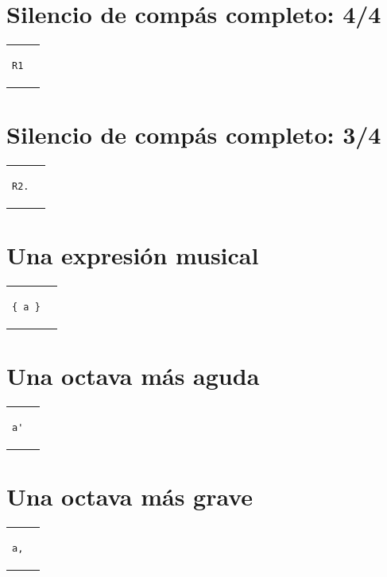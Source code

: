 \documentclass[a4paper,10pt,oneside,headinclude,titlepage]{article} %
\begin{document}
\section*{Silencio de compás completo: 4/4}
\begin{tabular}{m{2cm}m{2cm}}
\begin{verbatim}
R1
\end{verbatim}
&
\begin[fragment]{lilypond}
R1
\end{lilypond}
\end{tabular}

\section*{Silencio de compás completo: 3/4}
\begin{tabular}{m{2cm}m{2cm}}
\begin{verbatim}
R2.
\end{verbatim}
&
\begin[fragment]{lilypond}
\time 3/4 R2.
\end{lilypond}
\end{tabular}

\section*{Una expresión musical}
\begin{tabular}{m{2cm}m{2cm}}
\begin{verbatim}
{ a }
\end{verbatim}
&
\begin[fragment]{lilypond}
{ a }
\end{lilypond}
\end{tabular}

\section*{Una octava más aguda}
\begin{tabular}{m{2cm}m{2cm}}
\begin{verbatim}
a'
\end{verbatim}
&
\begin[fragment]{lilypond}
a'
\end{lilypond}
\end{tabular}

\section*{Una octava más grave}
\begin{tabular}{m{2cm}m{2cm}}
\begin{verbatim}
a,
\end{verbatim}
&
\begin[fragment]{lilypond}
a,
\end{lilypond}
\end{tabular}
\end{document}
